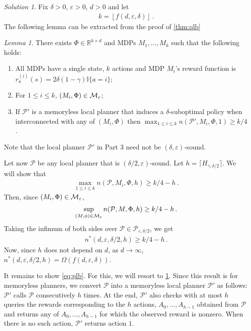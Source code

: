 \documentclass{article}
\newcommand{\cP}{\mathcal{P}}
\DeclareMathOperator*{\1}{\mathbbm{1}}
\newcommand{\one}[1]{\mathbb{I}\{#1\}}
\newcommand{\0}{\mathbf{0}}
\theoremstyle{definition}
\theoremstyle{remark}
\newtheorem*{solution*}{Solution}
\theoremstyle{theorem}
\newtheorem{lemma}{Lemma}
\begin{document}
\begin{solution*}
Fix $\delta>0$, $\varepsilon>0$, $d>0$ and let
\begin{align*}
k =\left\lfloor f(d,\varepsilon,\delta) \right\rfloor\,.
\end{align*}
The following lemma can be extracted from the proof of \cref{thm:qlb}
\begin{lemma}
\label{lem:mlp}
There exists $\Phi \in \mathbb{R}^{k\times d}$ and MDPs $M_1, \dots, M_k$ such that the following holds:
\begin{enumerate}
\item All MDPs have a single state, $k$ actions and MDP $M_i$'s reward function is $r^{(i)}_a(s) = 2\delta(1-\gamma) \one{a=i}$;
\item For $1\le i \le k$, $(M_i,\Phi)\in \mathcal{M}_{\varepsilon}$;
\item If $\cP'$ is a memoryless local planner that induces a $\delta$-suboptimal policy when interconnected with any of $(M_i,\Phi)$ then $\max_{1\le i \le k} n(\cP',M_i,\Phi,1)\ge k/4$.
\end{enumerate}
\end{lemma}
\noindent Note that the local planner $\cP'$ in Part 3 need not be $(\delta,\varepsilon)$-sound.

Let now $\cP$ be any local planner that is $(\delta/2,\varepsilon)$-sound.
Let $h = \lceil H_{\gamma,\delta/2} \rceil$. We will show that
\begin{align}
\max_{1\le i \le k} n(\cP,M_i,\Phi,h) \ge k/4-h\,.
\label{eq:plb}
\end{align}
Then, since $(M_i,\Phi)\in \mathcal{M}_\varepsilon$,
\begin{align*}
\sup_{(M,\phi) \in \cM_\varepsilon} n(\cP,M,\Phi,h) \ge k/4 - h \,.
\end{align*}
Taking the infimum of both sides over $\cP\in \cP_{\varepsilon,\delta/2}$, we get
\begin{align*}
n^*(d,\varepsilon,\delta/2,h) \ge k/4-h\,.
\end{align*}
Now, since $h$ does not depend on $d$,
as $d\to \infty$,
$n^*(d,\varepsilon,\delta/2,h)= \Omega(f(d,\varepsilon,\delta))$.

It remains to show \cref{eq:plb}.
For this, we will resort to \cref{lem:mlp}. Since this result is for memoryless planners, we convert $\cP$ into a memoryless local planner $\cP'$ as follows:
$\cP'$ calls $\cP$ consecutively $h$ times.
At the end, $\cP'$ also checks with at most $h$ queries the rewards corresponding to the 
$h$ actions,
 $A_0,\dots,A_{h-1}$ obtained from $\cP$ and returns any of $A_0,\dots,A_{h-1}$
 for which the observed reward is nonzero.
 When there is no such action, $\cP'$ returns action $1$.
 

\end{solution*}
\end{document}
